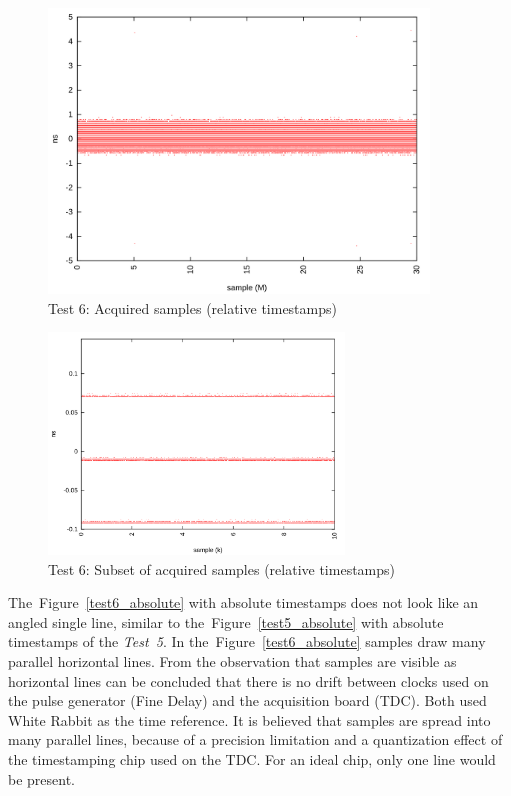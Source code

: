 \documentclass[a4paper, 12pt]{article}
\begin{document}
\begin{figure}[ht!]
  \centering
  \includegraphics[width=0.9\textwidth]{img/test6_samples_relative.png}
  \caption{Test 6: Acquired samples (relative timestamps)}
  \label{test6_relative}
\end{figure}

\begin{figure}[ht!]
  \centering
  \includegraphics[width=0.7\textwidth]{img/test6_samples_relative_zoomxy.png}
  \caption{Test 6: Subset of acquired samples (relative timestamps)}
  \label{test6_relative_zoomy}
\end{figure}

The~Figure~\ref{test6_absolute} with absolute timestamps does not look like
an angled single line, similar to the~Figure~\ref{test5_absolute} with
absolute timestamps of the \textit{Test~5}. In the~Figure~\ref{test6_absolute}
samples draw many parallel horizontal lines. From the observation that samples
are visible as horizontal lines can be concluded that there is no drift between
clocks used on the pulse generator (Fine Delay) and the acquisition board (TDC).
Both used White Rabbit as the time reference.
It is believed that samples are spread into many parallel lines,
because of a precision limitation and a quantization effect of the timestamping
chip used on the TDC.
For an ideal chip, only one line would be present.
\end{document}
